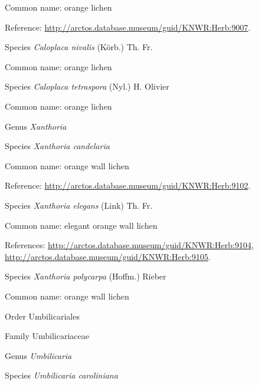 \documentclass[9pt, article]{memoir}
\begin{document}
\begin{multicols}{2}
Common name: orange lichen

Reference: 
\url{http://arctos.database.museum/guid/KNWR:Herb:9007}.

\vspace{6pt}\noindent\hspace{36pt}Species \textit{Caloplaca nivalis} (Körb.) Th. Fr.


Common name: orange lichen

\vspace{6pt}\noindent\hspace{36pt}Species \textit{Caloplaca tetraspora} (Nyl.) H. Olivier


Common name: orange lichen

\vspace{6pt}\noindent\hspace{30pt}Genus \textit{Xanthoria}


\vspace{6pt}\noindent\hspace{36pt}Species \textit{Xanthoria candelaria}


Common name: orange wall lichen

Reference: 
\url{http://arctos.database.museum/guid/KNWR:Herb:9102}.

\vspace{6pt}\noindent\hspace{36pt}Species \textit{Xanthoria elegans} (Link) Th. Fr.


Common name: elegant orange wall lichen

References: 
\url{http://arctos.database.museum/guid/KNWR:Herb:9104}, 
\url{http://arctos.database.museum/guid/KNWR:Herb:9105}.

\vspace{6pt}\noindent\hspace{36pt}Species \textit{Xanthoria polycarpa} (Hoffm.) Rieber


Common name: orange wall lichen

\vspace{6pt}\noindent\hspace{18pt}Order Umbilicariales


\vspace{6pt}\noindent\hspace{24pt}Family Umbilicariaceae


\vspace{6pt}\noindent\hspace{30pt}Genus \textit{Umbilicaria}


\vspace{6pt}\noindent\hspace{36pt}Species \textit{Umbilicaria caroliniana}



\end{multicols}
\end{document}
